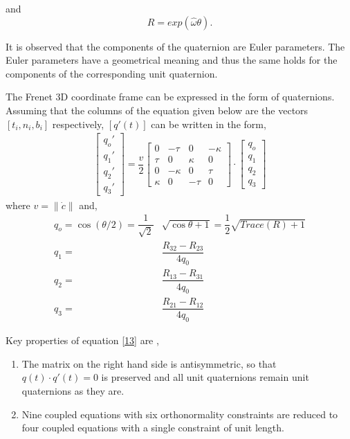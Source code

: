 and  \[R = exp\left(\hat{\omega}\theta\right).\] 

It is observed that the components of the quaternion are Euler parameters. The Euler parameters have a geometrical meaning and thus the same holds for the components of the corresponding unit quaternion.

The Frenet 3D coordinate frame can be expressed in the form of quaternions. Assuming that the columns of the equation given below are the vectors $ [t_{i}, n_{i}, b_{i}] $ respectively, $ [q'(t)] $ can be written in the form,
\begin{eqnarray}
\left[ 
\begin{array}{c}
q_{o}'\\
q_{1}'\\
q_{2}'\\
q_{3}'
\end{array}
\right]=
\dfrac{v}{2} 
\left[
\begin{array}{cccc}
0 & -\tau & 0 & -\kappa \\
\tau & 0 & \kappa & 0 \\
0 & -\kappa & 0 & \tau \\
\kappa & 0 & -\tau & 0
\end{array}
\right] 
\cdot
\left[ 
\begin{array}{c}
q_{o}\\
q_{1}\\
q_{2}\\
q_{3}
\end{array}
\right] 
\label{13}
\end{eqnarray}
where $ v = \parallel \dot{c} \parallel $ and, 
\begin{align*}
q_{o}= \cos (\theta / 2) = \dfrac{1}{\sqrt{2}} & \sqrt{\cos \theta +1} = \dfrac{1}{2} \sqrt{Trace (R) +1} \\
q_{1}=& \dfrac{R_{32}-R_{23}}{4q_{0}} \\
q_{2}=& \dfrac{R_{13}-R_{31}}{4q_{0}} \\
q_{3}=& \dfrac{R_{21}-R_{12}}{4q_{0}}
\end{align*}

Key properties of equation \ref{13} are \citep{Hanson},
\begin{enumerate}
\item The matrix on the right hand side is antisymmetric, so that $ q(t) \cdot q'(t)=0 $ is preserved and all unit quaternions remain unit quaternions as they are.
\item Nine coupled equations with six orthonormality constraints are reduced to four coupled equations with a single constraint of unit length.
\end{enumerate}

